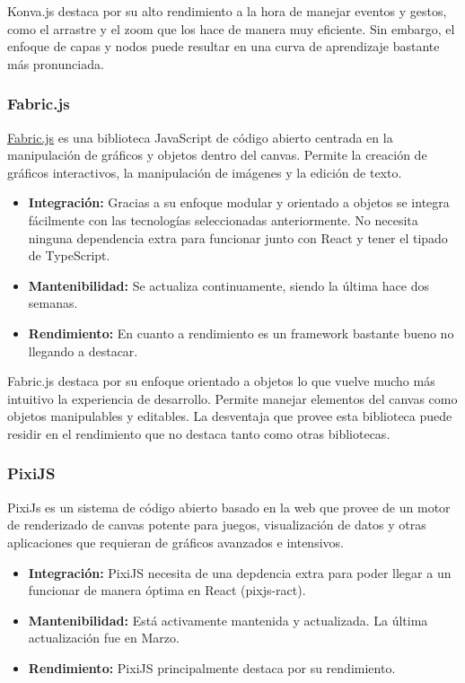 Konva.js destaca por su alto rendimiento a la hora de manejar eventos y gestos, como el arrastre y el zoom que los hace de manera muy eficiente. Sin embargo, el enfoque de capas y nodos puede resultar en una curva de aprendizaje bastante más pronunciada.

\subsubsection{Fabric.js}

\href{http://fabricjs.com/}{Fabric.js} es una biblioteca JavaScript de código abierto centrada en la manipulación de gráficos y objetos dentro del canvas. Permite la creación de gráficos interactivos, la manipulación de imágenes y la edición de texto.

\begin{itemize}
    \item[\esp] \textbf{Integración:} Gracias a su enfoque modular y orientado a objetos se integra fácilmente con las tecnologías seleccionadas anteriormente. No necesita ninguna dependencia extra para funcionar junto con React y tener el tipado de TypeScript.
    \item[\bien] \textbf{Mantenibilidad:} Se actualiza continuamente, siendo la última hace dos semanas.
    \item[\bien] \textbf{Rendimiento:} En cuanto a rendimiento es un framework bastante bueno no llegando a destacar.
\end{itemize}

Fabric.js destaca por su enfoque orientado a objetos lo que vuelve mucho más intuitivo la experiencia de desarrollo. Permite manejar elementos del canvas como objetos manipulables y editables. La desventaja que provee esta biblioteca puede residir en el rendimiento que no destaca tanto como otras bibliotecas.

\subsubsection{PixiJS}

PixiJs es un sistema de código abierto basado en la web que provee de un motor de renderizado de canvas potente para juegos, visualización de datos y otras aplicaciones que requieran de gráficos avanzados e intensivos.

\begin{itemize}
    \item[\regular] \textbf{Integración:} PixiJS necesita de una depdencia extra para poder llegar a un funcionar de manera óptima en React (pixjs-ract).
    \item[\bien] \textbf{Mantenibilidad:} Está activamente mantenida y actualizada. La última actualización fue en Marzo.
    \item[\esp] \textbf{Rendimiento:} PixiJS principalmente destaca por su rendimiento.
\end{itemize}


